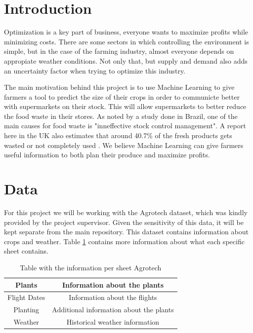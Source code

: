 \documentclass{article}
\begin{document}
\section{Introduction}
Optimization is a key part of business, everyone wants to maximize profits while minimizing costs.
There are some sectors in which controlling the environment is simple, but in the case of the farming
industry, almost everyone depends on appropiate weather conditions. Not only that, but supply and demand also
adds an uncertainty factor when trying to optimize this industry.

The main motivation behind this project
is to use Machine Learning to give farmers a tool to predict the size of their crops in order to communicte
better with supermarkets on their stock. This will allow supermarkets to better reduce the food waste
in their stores. As noted by a study done in Brazil, one of the main causes for food waste
is "inneffective stock control management". \cite{brazfood} A report here in the UK also estimates that around
40.7\% of the fresh products gets wasted or not completely used \cite{ukarticle}. We believe Machine Learning
can give farmers useful information to both plan their produce and maximize profits.

\section{Data}

For this project we will be working with the Agrotech dataset, which was kindly provided by the project
supervisor. Given the sensitivity of this data, it will be kept separate from the main repository.
This dataset contains information about crops and weather. Table \ref{table:1} contains more information about
what each specific sheet contains.

\begin{table}[h]
    \centering
    \begin{tabular}{ | c | c |}
        \hline
        Plants & Information about the plants \\
        \hline
        Flight Dates & Information about the flights \\
        \hline
        Planting & Additional information about the plants \\
        \hline
        Weather & Historical weather information \\
        \hline
    \end{tabular}
    \caption{Table with the information per sheet Agrotech}
    \label{table:1}
\end{table}
\end{document}
